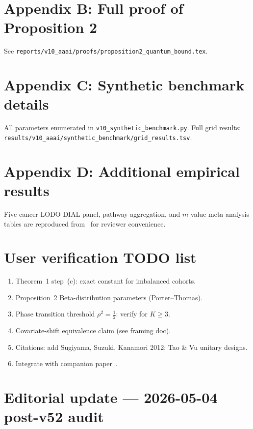 \documentclass[letterpaper,11pt]{article}
\begin{document}
\section{Appendix B: Full proof of Proposition 2}
See \texttt{reports/v10\_aaai/proofs/proposition2\_quantum\_bound.tex}.

\section{Appendix C: Synthetic benchmark details}
All parameters enumerated in \texttt{v10\_synthetic\_benchmark.py}.
Full grid results:
\texttt{results/v10\_aaai/synthetic\_benchmark/grid\_results.tsv}.

\section{Appendix D: Additional empirical results}
Five-cancer LODO DIAL panel, pathway aggregation, and $m$-value
meta-analysis tables are reproduced from~\cite{thcadash_bioinfo_2026}
for reviewer convenience.

\section*{User verification TODO list}
\begin{enumerate}
\item Theorem~1 step~(c): exact constant for imbalanced cohorts.
\item Proposition~2 Beta-distribution parameters (Porter--Thomas).
\item Phase transition threshold $\rho^2=\tfrac12$: verify for $K\ge 3$.
\item Covariate-shift equivalence claim (see framing doc).
\item Citations: add Sugiyama, Suzuki, Kanamori 2012; Tao \& Vu
  unitary designs.
\item Integrate with companion paper~\cite{thcadash_bioinfo_2026}.
\end{enumerate}


\section*{Editorial update --- 2026-05-04 post-v52 audit}
\end{document}
